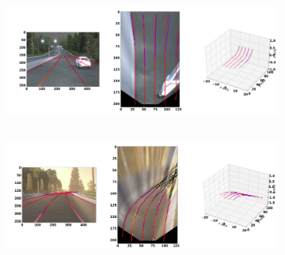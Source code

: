         \begin{figure}[h]
      \caption{Qualitative results of the trained GenLaneNet\cite{guo2020gen} trained with complex binary lane segmentation architecture on balanced scenes from sim3D\cite{} dataset: (a) uphill (b) downhill scenario}
        \centering
        \begin{subfigure}{0.6\textwidth}
        \includegraphics[width=1\linewidth, height=4cm]{images/uphill_standard.png} 
        \caption{  }
        \label{fig:subim1}
        \end{subfigure}
        \begin{subfigure}{0.6\textwidth}
        \includegraphics[width=1\linewidth,height=4cm]{images/downhill_standard.png}
        \caption{}
        \label{fig:subim2}
        \end{subfigure}
        \end{figure}


